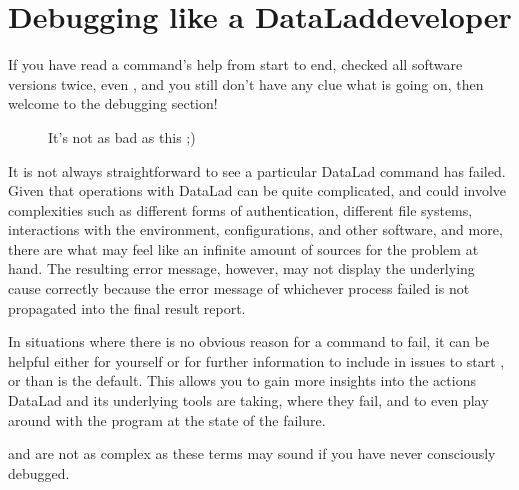 \ignorespaces 

\section{Debugging like a DataLad\sphinxhyphen{}developer}
\label{\detokenize{basics/101-135-help:debugging-like-a-datalad-developer}}\label{\detokenize{basics/101-135-help:index-1}}
\sphinxAtStartPar
If you have read a command’s help from start to end, checked all software versions twice, even , and you still don’t have any clue what is going on, then welcome to the debugging section!

\begin{figure}[tbp]
\centering
\capstart

\noindent{}
\caption{It’s not as bad as this ;\sphinxhyphen{})}\label{\detokenize{basics/101-135-help:id4}}\end{figure}

\sphinxAtStartPar
It is not always straightforward to see  a particular DataLad command has failed.
Given that operations with DataLad can be quite complicated, and could involve complexities such as different forms of authentication, different file systems, interactions with the environment, configurations, and other software, and  more, there are what may feel like an infinite amount of sources for the problem at hand.
The resulting error message, however, may not display the underlying cause correctly because the error message of whichever process failed is not propagated into the final result report.

\sphinxAtStartPar
In situations where there is no obvious reason for a command to fail, it can be helpful \textendash{} either for yourself or for further information to include in {\hyperref[\detokenize{glossary:term-GitHub}]{}} issues \textendash{} to start , or  than is the default.
This allows you to gain more insights into the actions DataLad and its underlying tools are taking, where  they fail, and to even play around with the program at the state of the failure.

\sphinxAtStartPar
{\hyperref[\detokenize{glossary:term-debugging}]{}} and {\hyperref[\detokenize{glossary:term-logging}]{}} are not as complex as these terms may sound if you have never consciously debugged.

